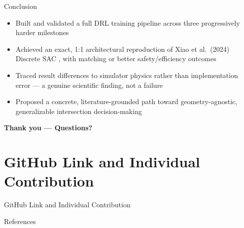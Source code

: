 \documentclass[aspectratio=169,10pt]{beamer}
\begin{document}

\begin{frame}{Conclusion}
    \begin{itemize}
        \item Built and validated a full DRL training pipeline across three progressively harder milestones
        \item Achieved an exact, 1:1 architectural reproduction of Xiao et al.\ (2024) Discrete SAC \cite{xiao2024decision}, with matching or better safety/efficiency outcomes
        \item Traced result differences to simulator physics rather than implementation error --- a genuine scientific finding, not a failure
        \item Proposed a concrete, literature-grounded path toward \alert{geometry-agnostic, generalizable} intersection decision-making
    \end{itemize}
    \vspace{10pt}
    \centering \Large \textbf{Thank you --- Questions?}
\end{frame}

\section{GitHub Link and Individual Contribution}

\begin{frame}{GitHub Link and Individual Contribution}
\end{frame}

\appendix
\begin{frame}[allowframebreaks]{References}
    \tiny
    
    
\end{frame}
\end{document}
